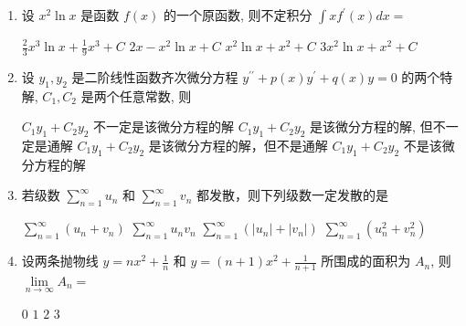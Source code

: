 \begin{enumerate}
\begin{enumerate}
\item 
设 $x^{2} \ln x$ 是函数 $f(x)$ 的一个原函数, 则不定积分 $\int x f^{\prime}(x) d x=$  


\fourchoices
{$\frac{2}{3} x^{3} \ln x+\frac{1}{9} x^{3}+C$}
{$2 x-x^{2} \ln x+C$}
{$x^{2} \ln x+x^{2}+C$}
{$3 x^{2} \ln x+x^{2}+C$}

\item 
设 $y_{1}, y_{2}$ 是二阶线性函数齐次微分方程 $y^{\prime \prime}+p(x) y^{\prime}+q(x) y=0$ 的两个特解, $C_{1}, C_{2}$ 是两个任意常数, 则  


\fourchoices
{$C_{1} y_{1}+C_{2} y_{2}$ 不一定是该微分方程的解}
{$C_{1} y_{1}+C_{2} y_{2}$ 是该微分方程的解, 但不一定是通解}
{$C_{1} y_{1}+C_{2} y_{2}$ 是该微分方程的解，但不是通解}
{$C_{1} y_{1}+C_{2} y_{2}$ 不是该微分方程的解}

\item 
若级数 $\sum\limits_{n=1}^{\infty} u_{n}$ 和 $\sum\limits_{n=1}^{\infty} v_{n}$ 都发散，则下列级数一定发散的是  


\fourchoices
{$\sum\limits_{n=1}^{\infty}\left(u_{n}+v_{n}\right)$}
{$\sum\limits_{n=1}^{\infty} u_{n} v_{n}$}
{$\sum\limits_{n=1}^{\infty}\left(\left|u_{n}\right|+\left|v_{n}\right|\right)$}
{$\sum\limits_{n=1}^{\infty}\left(u_{n}^{2}+v_{n}^{2}\right)$}

\item 
设两条抛物线 $y=n x^{2}+\frac{1}{n}$ 和 $y=(n+1) x^{2}+\frac{1}{n+1}$ 所围成的面积为 $A_{n}$, 则 $\lim\limits _{n \rightarrow \infty} A_{n}=$ 



\fourchoices
{$ 0 $}
{$ 1 $}
{$ 2 $}
{$ 3 $}


		
	\end{enumerate}


\end{enumerate}
